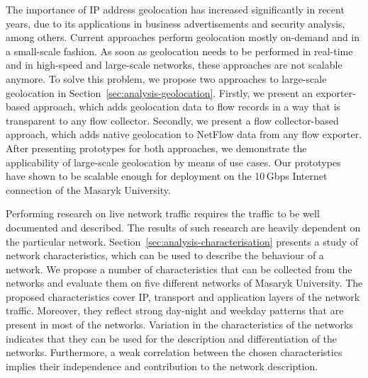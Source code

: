The importance of IP address geolocation has increased significantly in recent years, due to its applications in business advertisements and security analysis, among others. Current approaches perform geolocation mostly on-demand and in a small-scale fashion. As soon as geolocation needs to be performed in real-time and in high-speed and large-scale networks, these approaches are not scalable anymore. To solve this problem, we propose two approaches to large-scale geolocation in Section~\ref{sec:analysis-geolocation}. Firstly, we present an exporter-based approach, which adds geolocation data to flow records in a way that is transparent to any flow collector. Secondly, we present a flow collector-based approach, which adds native geolocation to NetFlow data from any flow exporter. After presenting prototypes for both approaches, we demonstrate the applicability of large-scale geolocation by means of use cases. Our prototypes have shown to be scalable enough for deployment on the 10\,Gbps Internet connection of the Masaryk University.

Performing research on live network traffic requires the traffic to be well documented and described. The results of such research are heavily dependent on the particular network. Section~\ref{sec:analysis-characterisation} presents a study of network characteristics, which can be used to describe the behaviour of a network. We propose a number of characteristics that can be collected from the networks and evaluate them on five different networks of Masaryk University. The proposed characteristics cover IP, transport and application layers of the network traffic. Moreover, they reflect strong day-night and weekday patterns that are present in most of the networks. Variation in the characteristics of the networks indicates that they can be used for the description and differentiation of the networks. Furthermore, a weak correlation between the chosen characteristics implies their independence and contribution to the network description.
